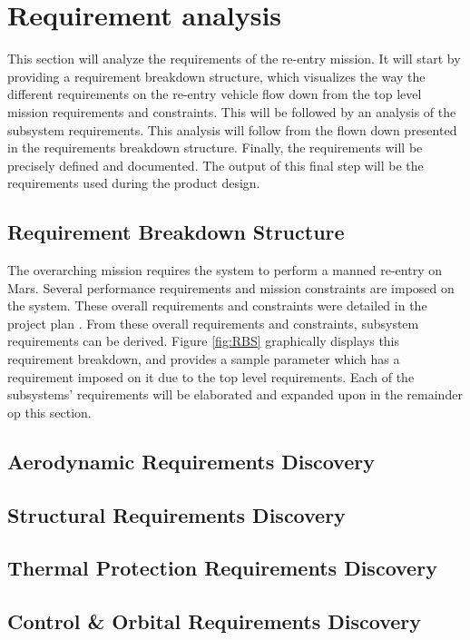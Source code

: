 \section{Requirement analysis} \label{ch:req}
This section will analyze the requirements of the re-entry mission. It will start by providing a requirement breakdown structure, which visualizes the way the different requirements on the re-entry vehicle flow down from the top level mission requirements and constraints. This will be followed by an analysis of the subsystem requirements. This analysis will follow from the flown down presented in the requirements breakdown structure. Finally, the requirements will be precisely defined and documented. The output of this final step will be the requirements used during the product design. %

\subsection{Requirement Breakdown Structure}
The overarching mission requires the system to perform a manned re-entry on Mars. Several performance requirements and mission constraints are imposed on the system. These overall requirements and constraints were detailed in the project plan \cite{Balasooriyan2015}. From these overall requirements and constraints, subsystem requirements can be derived. Figure \ref{fig:RBS} graphically displays this requirement breakdown, and provides a sample parameter which has a requirement imposed on it due to the top level requirements. Each of the subsystems' requirements will be elaborated and expanded upon in the remainder op this section. 

\subsection{Aerodynamic Requirements Discovery}

\subsection{Structural Requirements Discovery}

\subsection{Thermal Protection Requirements Discovery}

\subsection{Control & Orbital Requirements Discovery}

